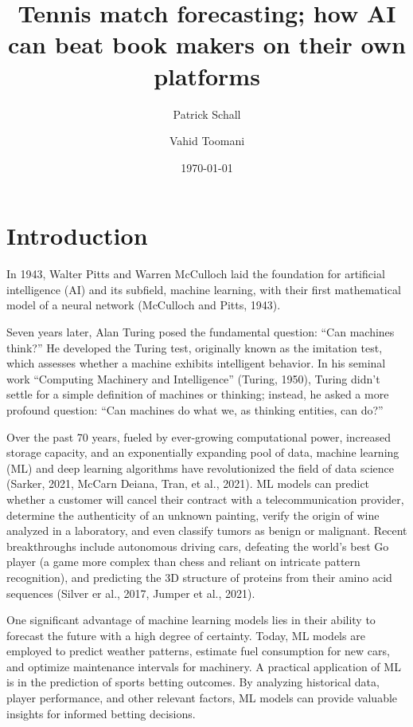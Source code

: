 \documentclass[preprint,aps,nofootinbib,a4paper,superscriptaddress,longbibliography,amsfonts,amssymb,amsmath,titlepage]{revtex4-2}
\begin{document}
\title{Tennis match forecasting; how AI can beat book makers on their own platforms}

\author{Patrick Schall}

\author{Vahid Toomani}

\date{\today}

\maketitle
\tableofcontents

\newpage

\section{Introduction}

In 1943, Walter Pitts and Warren McCulloch laid the foundation for artificial intelligence (AI) and its subfield, machine learning, with their first mathematical model of a neural network (McCulloch and Pitts, 1943).

Seven years later, Alan Turing posed the fundamental question: ``Can machines think?'' He developed the Turing test, originally known as the imitation test, which assesses whether a machine exhibits intelligent behavior. In his seminal work ``Computing Machinery and Intelligence'' (Turing, 1950), Turing didn’t settle for a simple definition of machines or thinking; instead, he asked a more profound question: ``Can machines do what we, as thinking entities, can do?''

Over the past 70 years, fueled by ever-growing computational power, increased storage capacity, and an exponentially expanding pool of data, machine learning (ML) and deep learning algorithms have revolutionized the field of data science (Sarker, 2021, McCarn Deiana, Tran, et al., 2021). ML models can predict whether a customer will cancel their contract with a telecommunication provider, determine the authenticity of an unknown painting, verify the origin of wine analyzed in a laboratory, and even classify tumors as benign or malignant. Recent breakthroughs include autonomous driving cars, defeating the world’s best Go player (a game more complex than chess and reliant on intricate pattern recognition), and predicting the 3D structure of proteins from their amino acid sequences (Silver er al., 2017, Jumper et al., 2021).

One significant advantage of machine learning models lies in their ability to forecast the future with a high degree of certainty. Today, ML models are employed to predict weather patterns, estimate fuel consumption for new cars, and optimize maintenance intervals for machinery. A practical application of ML is in the prediction of sports betting outcomes. By analyzing historical data, player performance, and other relevant factors, ML models can provide valuable insights for informed betting decisions.
\end{document}
